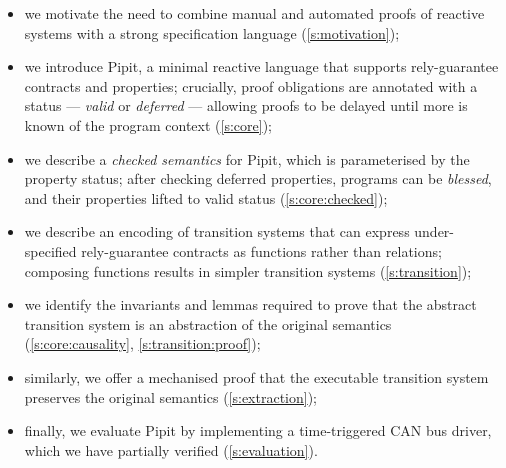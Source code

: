 \begin{itemize}
  \item we motivate the need to combine manual and automated proofs of reactive systems with a strong specification language (\autoref{s:motivation});
  \item we introduce Pipit, a minimal reactive language that supports rely-guarantee contracts and properties; crucially, proof obligations are annotated with a status --- \emph{valid} or \emph{deferred} --- allowing proofs to be delayed until more is known of the program context (\autoref{s:core});
  \item we describe a \emph{checked semantics} for Pipit, which is parameterised by the property status; after checking deferred properties, programs can be \emph{blessed}, and their properties lifted to valid status (\autoref{s:core:checked});
  \item we describe an encoding of transition systems that can express under-specified rely-guarantee contracts as functions rather than relations; composing functions results in simpler transition systems (\autoref{s:transition});
  \item we identify the invariants and lemmas required to prove that the abstract transition system is an abstraction of the original semantics (\autoref{s:core:causality}, \autoref{s:transition:proof});
  \item similarly, we offer a mechanised proof that the executable transition system preserves the original semantics (\autoref{s:extraction});
  \item finally, we evaluate Pipit by implementing a time-triggered CAN bus driver, which we have partially verified (\autoref{s:evaluation}).
\end{itemize}
